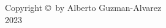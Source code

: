 \pagestyle{plain}
       \vspace*{15\baselineskip}


\begin{center}
Copyright \copyright\ by Alberto Guzman-Alvarez\\
2023
\end{center}

\newpage